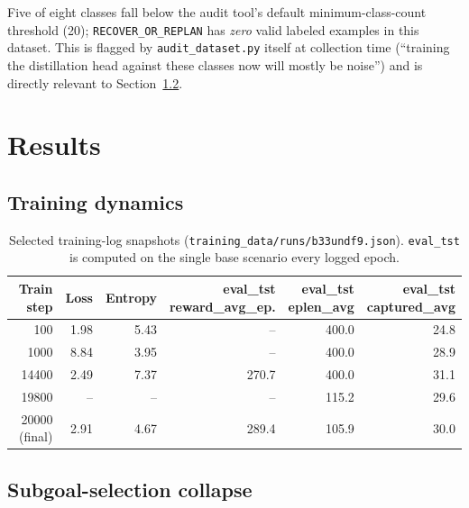 \documentclass[11pt]{article}
\newcommand{\code}[1]{\texttt{#1}}
\begin{document}
Five of eight classes fall below the audit tool's default minimum-class-count
threshold (20); \code{RECOVER\_OR\_REPLAN} has \emph{zero} valid labeled examples in
this dataset. This is flagged by \code{audit\_dataset.py} itself at collection time
(``training the distillation head against these classes now will mostly be
noise'') and is directly relevant to Section~\ref{sec:results-collapse}.

\section{Results}
\label{sec:results}

\subsection{Training dynamics}

\begin{table}[H]
\centering
\caption{Selected training-log snapshots (\texttt{training\_data/runs/b33undf9.json}).
\code{eval\_tst} is computed on the single base scenario every logged epoch.}
\label{tab:training-log}
\small
\begin{tabular}{@{}rrrrrr@{}}
\toprule
Train step & Loss & Entropy & \makecell[r]{eval\_tst\\reward\_avg\_ep.} & \makecell[r]{eval\_tst\\eplen\_avg} & \makecell[r]{eval\_tst\\captured\_avg} \\
\midrule
100    & 1.98  & 5.43 & --   & 400.0 & 24.8 \\
1000   & 8.84  & 3.95 & --   & 400.0 & 28.9 \\
14400  & 2.49  & 7.37 & 270.7 & 400.0 & 31.1 \\
19800  & --    & --   & --   & 115.2 & 29.6 \\
20000 (final) & 2.91 & 4.67 & 289.4 & 105.9 & 30.0 \\
\bottomrule
\end{tabular}
\end{table}

\subsection{Subgoal-selection collapse}
\label{sec:results-collapse}
\end{document}
